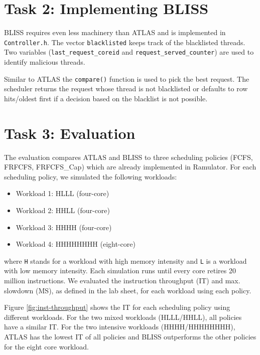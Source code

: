 \documentclass[a4paper]{article}
\newcommand{\wl}[1]{\textsf{\small #1}}
\begin{document}
\newpage

\section*{Task 2: Implementing BLISS}

BLISS requires even less machinery than ATLAS and is implemented in
\verb|Controller.h|. The vector \verb|blacklisted| keeps track of the
blacklisted threads. Two variables (\verb|last_request_coreid| and
\verb|request_served_counter|) are used to identify malicious threads.

Similar to ATLAS the \verb|compare()| function is used to pick the best request.
The scheduler returns the request whose thread is not blacklisted or defaults to
row hits/oldest first if a decision based on the blacklist is not possible.

\section*{Task 3: Evaluation}


The evaluation compares ATLAS and BLISS to three scheduling policies (FCFS,
FRFCFS, FRFCFS\_Cap) which are already implemented in Ramulator. For each
scheduling policy, we simulated the following workloads:
\begin{itemize}
    \item Workload 1: \wl{HLLL} (four-core)
    \item Workload 2: \wl{HHLL} (four-core)
    \item Workload 3: \wl{HHHH} (four-core)
    \item Workload 4: \wl{HHHHHHHH} (eight-core)
\end{itemize}
where \texttt{H} stands for a workload with high memory intensity and \texttt{L}
is a workload with low memory intensity. Each simulation runs until every core
retires 20 million instructions. We evaluated the instruction throughput (IT)
and max. slowdown (MS), as defined in the lab sheet, for each workload using
each policy.

Figure \ref{fig:inst-throughput} shows the IT for each scheduling policy using
different workloads. For the two mixed workloads (\wl{HLLL/HHLL}), all policies
have a similar IT. For the two intensive workloads (\wl{HHHH/HHHHHHHH}), ATLAS has
the lowest IT of all policies and BLISS outperforms the other policies for the
eight core workload.
\end{document}
